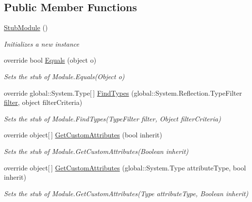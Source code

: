 \subsection*{Public Member Functions}
\begin{DoxyCompactItemize}
\item 
\hyperlink{class_system_1_1_reflection_1_1_fakes_1_1_stub_module_a8900ef94ea3eb274dfe109054bff2c2e}{Stub\-Module} ()
\begin{DoxyCompactList}\small\item\em Initializes a new instance\end{DoxyCompactList}\item 
override bool \hyperlink{class_system_1_1_reflection_1_1_fakes_1_1_stub_module_aff43506a433633a8082078e8247431ce}{Equals} (object o)
\begin{DoxyCompactList}\small\item\em Sets the stub of Module.\-Equals(\-Object o)\end{DoxyCompactList}\item 
override global\-::\-System.\-Type\mbox{[}$\,$\mbox{]} \hyperlink{class_system_1_1_reflection_1_1_fakes_1_1_stub_module_a6f20936832d557b1018ed909a3a2d6a8}{Find\-Types} (global\-::\-System.\-Reflection.\-Type\-Filter \hyperlink{jquery-1_810_82-vsdoc_8js_ac99d0cf56cab46114f5765a14e03ad6d}{filter}, object filter\-Criteria)
\begin{DoxyCompactList}\small\item\em Sets the stub of Module.\-Find\-Types(\-Type\-Filter filter, Object filter\-Criteria)\end{DoxyCompactList}\item 
override object\mbox{[}$\,$\mbox{]} \hyperlink{class_system_1_1_reflection_1_1_fakes_1_1_stub_module_ae3178bbda72419e115a548843100d9a7}{Get\-Custom\-Attributes} (bool inherit)
\begin{DoxyCompactList}\small\item\em Sets the stub of Module.\-Get\-Custom\-Attributes(\-Boolean inherit)\end{DoxyCompactList}\item 
override object\mbox{[}$\,$\mbox{]} \hyperlink{class_system_1_1_reflection_1_1_fakes_1_1_stub_module_a2086f8dab9634532967af928238c9908}{Get\-Custom\-Attributes} (global\-::\-System.\-Type attribute\-Type, bool inherit)
\begin{DoxyCompactList}\small\item\em Sets the stub of Module.\-Get\-Custom\-Attributes(\-Type attribute\-Type, Boolean inherit)\end{DoxyCompactList}\item 

\end{DoxyCompactItemize}

